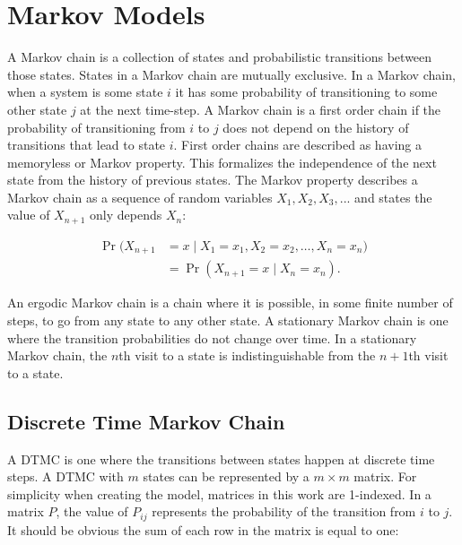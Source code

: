 \section{Markov Models}


A Markov chain is a collection of states and probabilistic transitions between those states.
States in a Markov chain are mutually exclusive.
In a Markov chain, when a system is some state $i$ it has some probability of transitioning to some other state $j$ at the next time-step.
A Markov chain is a first order chain if the probability of transitioning from $i$ to $j$ does not depend on the history of transitions that lead to state $i$.
First order chains are described as having a memoryless or Markov property.
This formalizes the independence of the next state from the history of previous states.
The Markov property describes a Markov chain as a sequence of random variables $X_{1}, X_{2}, X_{3}, ...$ and states the value of $X_{n+1}$ only depends $X_{n}$: \cite{MARKOV3}

\begin{align} \Pr(X_{n+1}&=x\mid X_1=x_1, X_2=x_2, \ldots, X_n=x_n)
\nonumber \\ &= \Pr(X_{n+1}=x\mid X_n=x_n). \end{align}

An ergodic Markov chain is a chain where it is possible, in some finite number of steps, to go from any state to any other state.
A stationary Markov chain is one where the transition probabilities do not change over time.
In a stationary Markov chain, the $n$th visit to a state is indistinguishable from the $n+1$th visit to a state.

\subsection{Discrete Time Markov Chain}

A \ac{DTMC} is one where the transitions between states happen at discrete time steps.
A \ac{DTMC} with $m$ states can be represented by a $m\times m$ matrix.
For simplicity when creating the model, matrices in this work are 1-indexed.
In a matrix $P$, the value of $P_{ij}$ represents the probability of the transition from $i$ to $j$.
It should be obvious the sum of each row in the matrix is equal to one:

